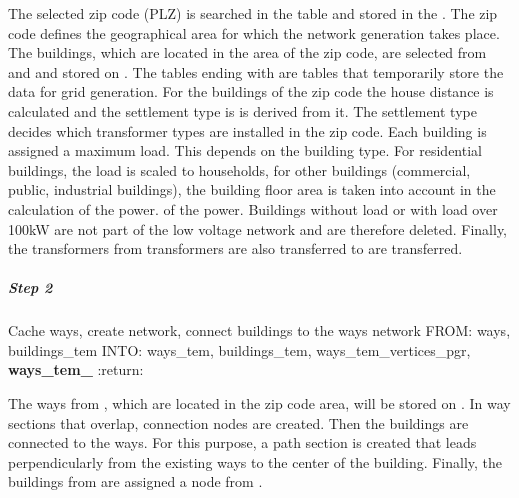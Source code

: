 \documentclass[letterpaper,10pt,english]{sphinxmanual}
\begin{document}
\sphinxAtStartPar
The selected zip code (PLZ) is searched in the table
 and stored in the . The zip code
defines the geographical area for which the network generation takes place.
The buildings, which are located in the area of the zip code, are selected from  and 
and stored on . The tables ending with 
are tables that temporarily store the data for grid generation. For
the buildings of the zip code the house distance is calculated and the settlement type is
is derived from it. The settlement type decides which transformer types are installed in the zip code.
Each building is assigned a maximum load.
This depends on the building type. For residential buildings, the load is
scaled to households, for other buildings (commercial, public,
industrial buildings), the building floor area is taken into account in the calculation of the power.
of the power. Buildings without load or with load over 100kW
are not part of the low voltage network and are therefore deleted.
Finally, the transformers from transformers are also transferred to 
are transferred.


\subparagraph{Step 2}
\label{\detokenize{grid_generation/explanation/grid_generation_process:step-2}}

\begin{fulllineitems}
\label{\detokenize{grid_generation/explanation/grid_generation_process:syngrid.GridGenerator.GridGenerator.preprocess_ways}}
\pysigstartsignatures
{}
\pysigstopsignatures
\sphinxAtStartPar
Cache ways, create network, connect buildings to the ways network
FROM: ways, buildings\_tem
INTO: ways\_tem, buildings\_tem, ways\_tem\_vertices\_pgr, {\color{red}\bfseries{}ways\_tem\_}
:return:

\end{fulllineitems}


\sphinxAtStartPar
The ways from , which are located in the zip code area, will be
stored on . In way sections that overlap, connection nodes are created.
Then the buildings are connected to the ways.
For this purpose, a path section is created that leads perpendicularly
from the existing ways to the center of the building. Finally,
the buildings from  are assigned a node from .
\end{document}
